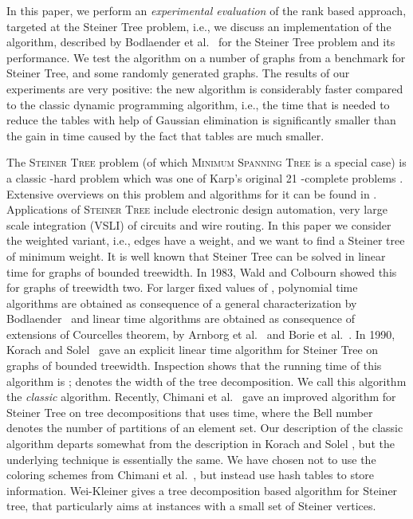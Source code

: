 \documentclass{llncs}
\begin{document}
In this paper, we perform an {\em experimental evaluation} of the rank based approach,
targeted at the {\sc Steiner Tree} problem, i.e., we discuss an implementation
of the algorithm, described by Bodlaender et al.~\cite{BodlaenderCKN12} for the
{\sc Steiner Tree} problem and its performance. We test the algorithm on
a number of graphs from a benchmark for Steiner Tree, and some randomly generated
graphs. The results of our experiments are very positive: the new algorithm is
considerably faster compared to the classic dynamic programming algorithm,
i.e., the time that is needed to reduce the tables with help of Gaussian elimination
is significantly smaller than the gain in time caused by the fact that tables are
much smaller.

The \textsc{Steiner Tree} problem (of which \textsc{Minimum Spanning Tree} is a special case) is a 
classic -hard problem which was one of Karp's original 21 -complete problems \cite{Karp72}. 
Extensive overviews on this problem and algorithms for it can be found in \cite{HwangRW92,Winter87}. 
Applications of \textsc{Steiner Tree} include electronic design automation, very large scale integration (VSLI) of circuits and wire routing. 
In this paper we consider the weighted variant, i.e., edges have a weight, and
we want to find a Steiner tree of minimum weight.
It is well known that {\sc Steiner Tree} can be solved in linear time for graphs of bounded treewidth. 
In 1983, Wald and Colbourn \cite{WaldC83} showed this for graphs of treewidth two. For larger fixed values of
, polynomial time algorithms are obtained as consequence of a general characterization by Bodlaender~\cite{Bodlaender87} and linear time algorithms are obtained as consequence of extensions of Courcelles theorem,
by Arnborg et al.~\cite{ArnborgLS91} and Borie et al.~\cite{BoriePT92}. In 1990, Korach and Solel~\cite{KorachS90}
gave an explicit linear time algorithm for {\sc Steiner Tree} on graphs of bounded treewidth.
Inspection shows that the running time of this algorithm is ;  denotes the width
of the tree decomposition. We call this
algorithm the {\em classic} algorithm. Recently, Chimani et al.~\cite{ChimaniMZ12} gave an improved
algorithm for {\sc Steiner Tree} on tree decompositions that uses  time,
where the Bell number  denotes the number of partitions of an  element set.
Our description of the classic algorithm departs somewhat from
the description in Korach and Solel \cite{KorachS90}, but the underlying technique is essentially the same.
We have chosen not to use the coloring schemes from Chimani et al.~\cite{ChimaniMZ12}, but instead 
use hash tables to store information.
Wei-Kleiner \cite{WeiKleiner13} gives a tree decomposition based algorithm for Steiner tree, that 
particularly aims at instances with a small set of Steiner vertices.
\end{document}
